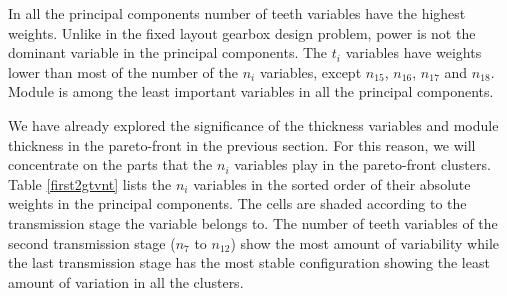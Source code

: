 In all the principal components number of teeth variables have the highest
weights. Unlike in the fixed layout gearbox design problem, power is not the 
dominant variable in the principal components. The $t_i$ variables have
weights lower than most of the number of the $n_i$ variables, except 
$n_{15}$, $n_{16}$, $n_{17}$ and $n_{18}$. Module is among the least important 
variables in all the principal components.

We have already explored the significance of the thickness variables and
module thickness in the pareto-front in the previous section. For this
reason, we will concentrate on the parts that the $n_i$ variables play in
the pareto-front clusters.  Table \ref{first2gtvnt} lists the $n_i$
variables in the sorted order of their absolute weights in the principal
components. The cells are shaded according to the transmission stage the
variable belongs to. The number of teeth variables of the second
transmission stage ($n_7$ to $n_{12}$) show the most amount of variability
while the last transmission stage has the most stable configuration showing
the least amount of variation in all the clusters.





